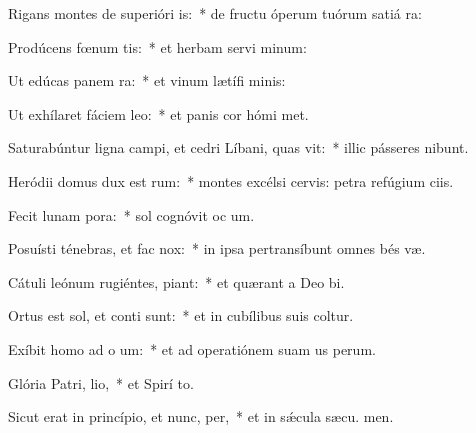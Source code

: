 \item Rigans montes de superióri is:~* de fructu óperum tuórum satiá ra:
\item Prodúcens fœnum tis:~* et herbam servi minum:
\item Ut edúcas panem  ra:~* et vinum lætífi  minis:
\item Ut exhílaret fáciem  leo:~* et panis cor hómi met.
\item Saturabúntur ligna campi, et cedri Líbani, quas vit:~* illic pásseres nibunt.
\item Heródii domus dux est rum:~* montes excélsi cervis: petra refúgium ciis.
\item Fecit lunam  pora:~* sol cognóvit oc um.
\item Posuísti ténebras, et fac  nox:~* in ipsa pertransíbunt omnes bés væ.
\item Cátuli leónum rugiéntes,  piant:~* et quærant a Deo  bi.
\item Ortus est sol, et conti sunt:~* et in cubílibus suis coltur.
\item Exíbit homo ad o um:~* et ad operatiónem suam us  perum.
\item Glória Patri,  lio,~* et Spirí to.
\item Sicut erat in princípio, et nunc,  per,~* et in sǽcula sæcu. men.
